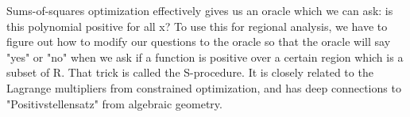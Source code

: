 Sums-of-squares optimization effectively gives us an oracle which we can ask: is this polynomial positive for all x? To use this for regional analysis, we have to figure out how to modify our questions to the oracle so that the oracle will say "yes" or "no" when we ask if a function is positive over a certain region which is a subset of R. That trick is called the S-procedure. It is closely related to the Lagrange multipliers from constrained optimization, and has deep connections to "Positivstellensatz" from algebraic geometry.

